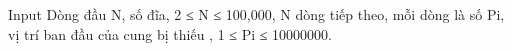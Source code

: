 Input
Dòng đầu N, số đĩa, 2 ≤ N ≤ 100,000,  N dòng tiếp theo, mỗi dòng là số Pi, vị trí ban đầu của cung bị thiếu , 1 ≤ Pi ≤ 10000000.
